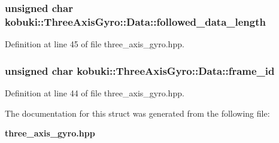 \subsubsection[{followed\-\_\-data\-\_\-length}]{\setlength{\rightskip}{0pt plus 5cm}unsigned char {\bf kobuki\-::\-Three\-Axis\-Gyro\-::\-Data\-::followed\-\_\-data\-\_\-length}}\label{structkobuki_1_1ThreeAxisGyro_1_1Data_a09d531b38cd9c41ebb4a6c5656c5026b}


\-Definition at line 45 of file three\-\_\-axis\-\_\-gyro.\-hpp.

\subsubsection[{frame\-\_\-id}]{\setlength{\rightskip}{0pt plus 5cm}unsigned char {\bf kobuki\-::\-Three\-Axis\-Gyro\-::\-Data\-::frame\-\_\-id}}\label{structkobuki_1_1ThreeAxisGyro_1_1Data_a69a8bea4b2d5129175788de1bf245b45}


\-Definition at line 44 of file three\-\_\-axis\-\_\-gyro.\-hpp.



\-The documentation for this struct was generated from the following file\-:\begin{DoxyCompactItemize}
\item 
{\bf three\-\_\-axis\-\_\-gyro.\-hpp}\end{DoxyCompactItemize}
